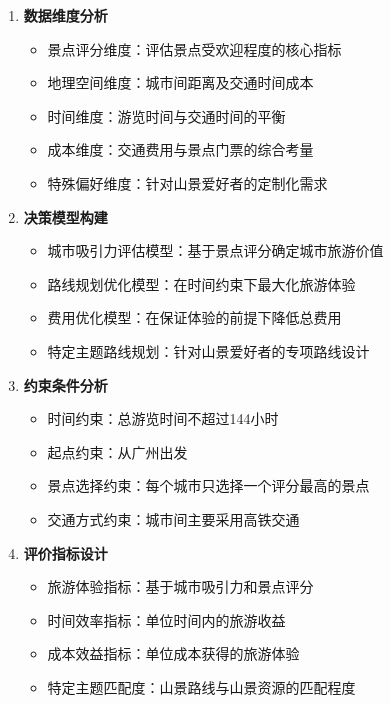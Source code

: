 \documentclass[withoutpreface,bwprint]{cumcmthesis} %
\begin{document}
\begin{enumerate}
    \item \textbf{数据维度分析}
    \begin{itemize}
        \item 景点评分维度：评估景点受欢迎程度的核心指标
        \item 地理空间维度：城市间距离及交通时间成本
        \item 时间维度：游览时间与交通时间的平衡
        \item 成本维度：交通费用与景点门票的综合考量
        \item 特殊偏好维度：针对山景爱好者的定制化需求
    \end{itemize}
    
    \item \textbf{决策模型构建}
    \begin{itemize}
        \item 城市吸引力评估模型：基于景点评分确定城市旅游价值
        \item 路线规划优化模型：在时间约束下最大化旅游体验
        \item 费用优化模型：在保证体验的前提下降低总费用
        \item 特定主题路线规划：针对山景爱好者的专项路线设计
    \end{itemize}
    
    \item \textbf{约束条件分析}
    \begin{itemize}
        \item 时间约束：总游览时间不超过144小时
        \item 起点约束：从广州出发
        \item 景点选择约束：每个城市只选择一个评分最高的景点
        \item 交通方式约束：城市间主要采用高铁交通
    \end{itemize}
    
    \item \textbf{评价指标设计}
    \begin{itemize}
        \item 旅游体验指标：基于城市吸引力和景点评分
        \item 时间效率指标：单位时间内的旅游收益
        \item 成本效益指标：单位成本获得的旅游体验
        \item 特定主题匹配度：山景路线与山景资源的匹配程度
    \end{itemize}
\end{enumerate}
\end{document}
